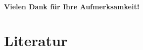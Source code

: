 \documentclass[colorBG,slideColor,8pt]{beamer}
\begin{document}
\begin{frame}
\begin{center}
	\large{\textbf{Vielen Dank für Ihre Aufmerksamkeit!}}
\end{center}
\end{frame}

\section{Literatur}

\begin{frame}
\begin{columns}
\begin{column}{0.9\linewidth}
\nocite{*}
\printbibliography
\end{column}
\end{columns}
\end{frame}
\end{document}

